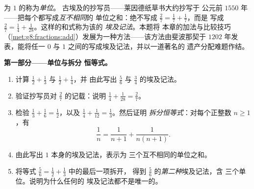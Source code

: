 \begin{problem}
\label{pb:g8:fractions:1}
为 $1$ 的称为\emph{单位}。
古埃及的抄写员——莱因德纸草书大约抄写于
公元前 $1550$ 年——把每个都写成\emph{互不相同}的
单位之和：绝不写成 $\frac27 = \frac17 + \frac17$，而是
写成 $\frac27 = \frac14 + \frac{1}{28}$。这样的和式称为该的
\emph{埃及记法}。本题将
本章的加法与比较技巧
（\cref{met:g8:fractions:add}）发展为一种方法——该方法由斐波那契于
$1202$ 年发表，能将任一
$0$ 与 $1$ 之间的写成埃及记法，并以一道著名的
遗产分配难题作结。

\medskip
\noindent\textbf{第一部分——单位与拆分
恒等式。}
\begin{enumerate}
  \item 计算 $\frac12 + \frac13$ 与 $\frac12 + \frac14$，并
        由此写出 $\frac56$ 与 $\frac34$ 的埃及记法。
  \item 验证抄写员对 $\frac27$ 的记载：说明
        $\frac14 + \frac{1}{28} = \frac27$。
  \item 检验 $\frac13 + \frac16 = \frac12$，以及
        $\frac14 + \frac{1}{12} = \frac13$。然后证明
        \emph{拆分恒等式}：对每个正整数
        $n \geq 1$，有
        \[
        \frac{1}{n} = \frac{1}{n+1} + \frac{1}{n(n+1)} .
        \]
  \item 由此写出 $1$ 本身的埃及记法，表示为
        三个互不相同的单位之和。
  \item 将等式 $\frac56 = \frac12 + \frac13$ 中的最后一项拆开，
        得到 $\frac56$ 的\emph{第二种}埃及记法，含
        三个单位。说明为什么任何的
        埃及记法都不是唯一的。
\end{enumerate}


\end{problem}
